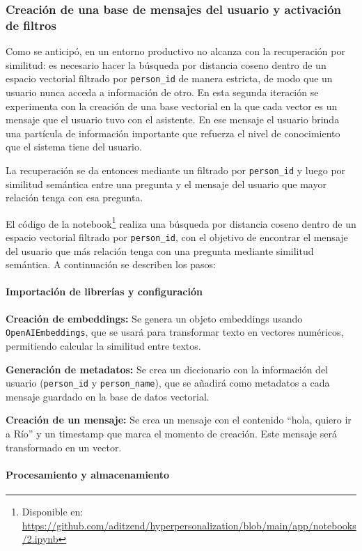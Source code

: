 \subsubsection{Creación de una base de mensajes del usuario y activación de filtros}

Como se anticipó, en un entorno productivo no alcanza con la recuperación por similitud: es necesario hacer la búsqueda por distancia coseno dentro de un espacio vectorial filtrado por \texttt{person\_id} de manera estricta, de modo que un usuario nunca acceda a información de otro. En esta segunda iteración se experimenta con la creación de una base vectorial en la que cada vector es un mensaje que el usuario tuvo con el asistente. En ese mensaje el usuario brinda una partícula de información importante que refuerza el nivel de conocimiento que el sistema tiene del usuario.

La recuperación se da entonces mediante un filtrado por \texttt{person\_id} y luego por similitud semántica entre una pregunta y el mensaje del usuario que mayor relación tenga con esa pregunta.

El código de la notebook\footnote{Disponible en: \url{https://github.com/aditzend/hyperpersonalization/blob/main/app/notebooks/2.ipynb}} realiza una búsqueda por distancia coseno dentro de un espacio vectorial filtrado por \texttt{person\_id}, con el objetivo de encontrar el mensaje del usuario que más relación tenga con una pregunta mediante similitud semántica. A continuación se describen los pasos:

\paragraph{Importación de librerías y configuración}

\textbf{Creación de embeddings:} Se genera un objeto embeddings usando \texttt{OpenAIEmbeddings}, que se usará para transformar texto en vectores numéricos, permitiendo calcular la similitud entre textos.

\textbf{Generación de metadatos:} Se crea un diccionario con la información del usuario (\texttt{person\_id} y \texttt{person\_name}), que se añadirá como metadatos a cada mensaje guardado en la base de datos vectorial.

\textbf{Creación de un mensaje:} Se crea un mensaje con el contenido ``hola, quiero ir a Río'' y un timestamp que marca el momento de creación. Este mensaje será transformado en un vector.

\paragraph{Procesamiento y almacenamiento}

